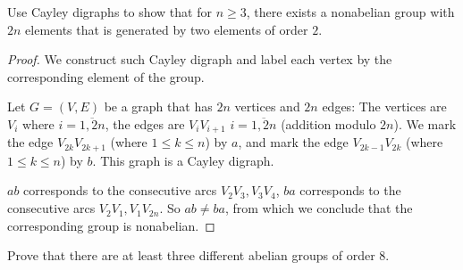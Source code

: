 \begin{exercise}
    Use Cayley digraphs to show that for $n \geq 3$, there exists a nonabelian group with $2n$ elements that is generated by two elements of order $2$.
\end{exercise}

\begin{proof}
    We construct such Cayley digraph and label each vertex by the corresponding element of the group.

    Let $G = (V, E)$ be a graph that has $2n$ vertices and $2n$ edges: The vertices are $V_{i}$ where $i = \overline{1,2n}$, the edges are $V_{i}V_{i+1}$ $i = \overline{1,2n}$ (addition modulo $2n$). We mark the edge $V_{2k}V_{2k+1}$ (where $1\le k \le n$) by $a$, and mark the edge $V_{2k-1}V_{2k}$ (where $1\leq k \leq n$) by $b$. This graph is a Cayley digraph.

    $ab$ corresponds to the consecutive arcs $V_{2}V_{3}, V_{3}V_{4}$, $ba$ corresponds to the consecutive arcs $V_{2}V_{1}, V_{1}V_{2n}$. So $ab\ne ba$, from which we conclude that the corresponding group is nonabelian.
\end{proof}

\begin{exercise}
    Prove that there are at least three different abelian groups of order 8.
\end{exercise}

